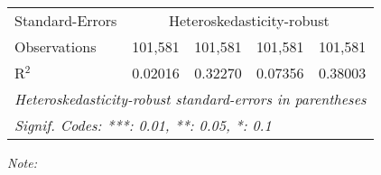 \begin{table}[htbp!]
\begin{adjustbox}{width = 1\textwidth, max height = 0.95\textheight, center}
\begin{threeparttable}[b]
\begin{tabular}{lcccc}
            \midrule 
            Standard-Errors & \multicolumn{4}{c}{Heteroskedasticity-robust} \\ 
            Observations         & 101,581                        & 101,581                        & 101,581                        & 101,581\\  
            R$^2$                & 0.02016                        & 0.32270                        & 0.07356                        & 0.38003\\  
            \midrule \midrule
            \multicolumn{5}{l}{\emph{Heteroskedasticity-robust standard-errors in parentheses}}\\
            \multicolumn{5}{l}{\emph{Signif. Codes: ***: 0.01, **: 0.05, *: 0.1}}\\
         \end{tabular}
         
         \begin{tablenotes}\item \medskip \textit{Note:}
         \end{tablenotes}
      \end{threeparttable}
   \end{adjustbox}
\end{table}


